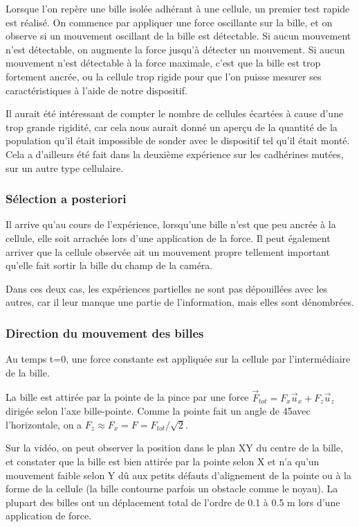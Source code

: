 Lorsque l'on repère une bille isolée adhérant à une cellule, un premier test rapide est réalisé.
On commence par appliquer une force oscillante sur la bille, et on observe si un mouvement oscillant de la bille est détectable. Si aucun mouvement n'est détectable, on augmente la force jusqu'à détecter un mouvement. Si aucun mouvement n'est détectable à la force maximale, c'est que la bille est trop fortement ancrée, ou la cellule trop rigide pour que l'on puisse mesurer ses caractéristiques à l'aide de notre dispositif. 

Il aurait été intéressant de compter le nombre de cellules écartées à cause d'une trop grande rigidité, car cela nous aurait donné un aperçu de la quantité de la population qu'il était impossible de sonder avec le dispositif tel qu'il était monté. Cela a d'ailleurs été fait dans la deuxième expérience sur les cadhérines mutées, sur un autre type cellulaire. 

\subsubsection{Sélection a posteriori}

Il arrive qu'au cours de l'expérience, lorsqu'une bille n'est que peu ancrée à la cellule, elle soit arrachée lors d'une application de la force.
Il peut également arriver que la cellule observée ait un mouvement propre tellement important qu'elle fait sortir la bille du  champ de la caméra. 

Dans ces deux cas, les expériences partielles ne sont pas dépouillées avec les autres, car il leur manque une partie de l'information, mais elles sont dénombrées.



\subsubsection{Direction du mouvement des billes}
Au temps t=0, une force constante est appliquée sur la cellule par l'intermédiaire de la bille. 

La bille est attirée par la pointe de la pince par une force $\vec{F}_{tot}=F_x \vec{u}_x+F_z \vec{u}_z$ dirigée selon l'axe bille-pointe. Comme la pointe fait un angle de 45\degres  avec l'horizontale, on a $F_z \approx F_x = F = F_{tot} / \sqrt{2} $. 

Sur la vidéo, on peut observer la position dans le plan XY du centre de la bille, et constater que la bille est bien attirée par la pointe selon X et n'a qu'un mouvement faible selon Y dû aux petits défauts d'alignement de la pointe ou à la forme de la cellule (la bille contourne parfois un obstacle comme le noyau). La plupart des billes ont un déplacement total de l'ordre de 0.1 à 0.5 \micro m lors d'une application de force. 

